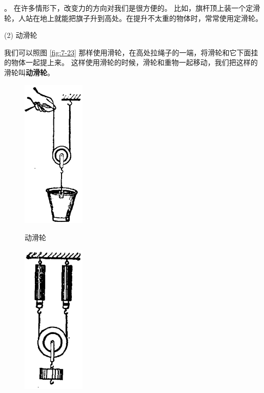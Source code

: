 。
在许多情形下，改变力的方向对我们是很方便的。
比如，旗杆顶上装一个定滑轮，人站在地上就能把旗子升到高处。在提升不太重的物体时，常常使用定滑轮。

(2) 动滑轮

我们可以照图 \ref{fig:7-23} 那样使用滑轮，在高处拉绳子的一端，将滑轮和它下面挂的物体一起提上来。
这样使用滑轮的时候，滑轮和重物一起移动，我们把这样的滑轮叫\textbf{动滑轮}。

\begin{figure}[htbp]
    \centering
    \begin{minipage}{3.5cm}
    \centering
    \includegraphics[width=3cm]{../pic/czwl1-ch7-23}
    \caption{动滑轮}\label{fig:7-23}
    \end{minipage}
    \qquad
    \begin{minipage}{5cm}
    \centering
    \includegraphics[width=3cm]{../pic/czwl1-ch7-24}
    \caption{}\label{fig:7-24}
    \end{minipage}
    \qquad
    \begin{minipage}{5cm}
    \centering

\end{minipage}
\end{figure}
